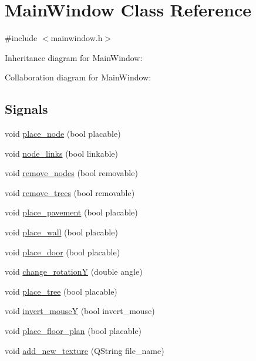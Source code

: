 \hypertarget{class_main_window}{}\section{Main\+Window Class Reference}
\label{class_main_window}


{\ttfamily \#include $<$mainwindow.\+h$>$}



Inheritance diagram for Main\+Window\+:


Collaboration diagram for Main\+Window\+:
\subsection*{Signals}
\begin{DoxyCompactItemize}
\item 
void \hyperlink{class_main_window_a6482943149e4c002007c8a3ff1f615b7}{place\+\_\+node} (bool placable)
\item 
void \hyperlink{class_main_window_a10adae5b734a5c4278553898f208cc71}{node\+\_\+links} (bool linkable)
\item 
void \hyperlink{class_main_window_a51552d2fe120f4a8fe7983b4d97833fe}{remove\+\_\+nodes} (bool removable)
\item 
void \hyperlink{class_main_window_a4d07200e445d16370d7643dd939201c8}{remove\+\_\+trees} (bool removable)
\item 
void \hyperlink{class_main_window_aa9dac1112dd0aee908476f2ac80b204e}{place\+\_\+pavement} (bool placable)
\item 
void \hyperlink{class_main_window_a62e6e53513bd523d21f34a729bfc57f4}{place\+\_\+wall} (bool placable)
\item 
void \hyperlink{class_main_window_ae7c415697c1a9c5d19f629a0dbf42d70}{place\+\_\+door} (bool placable)
\item 
void \hyperlink{class_main_window_a3ecc00f2af785c9dd335332d295c5115}{change\+\_\+rotation\+Y} (double angle)
\item 
void \hyperlink{class_main_window_a2053cb9d60ee05eb11bc00f5078610cd}{place\+\_\+tree} (bool placable)
\item 
void \hyperlink{class_main_window_a6f5eac59fb6ac872b0902c2e0870aa20}{invert\+\_\+mouse\+Y} (bool invert\+\_\+mouse)
\item 
void \hyperlink{class_main_window_af9d822d9ee146630477e31c7498d2355}{place\+\_\+floor\+\_\+plan} (bool placable)
\item 
void \hyperlink{class_main_window_aa1e71276ba30b1cdf28c291053296b50}{add\+\_\+new\+\_\+texture} (Q\+String file\+\_\+name)

\end{DoxyCompactItemize}

